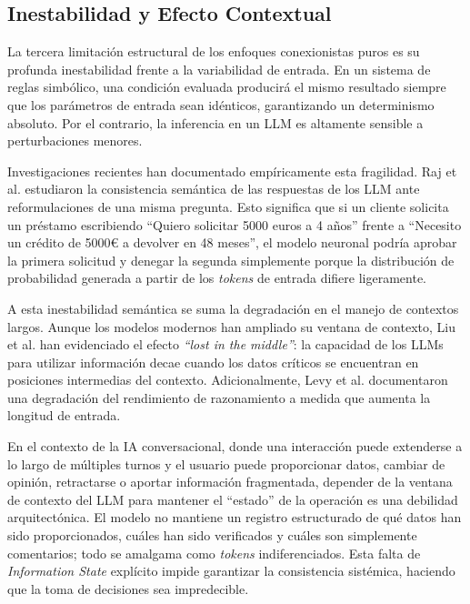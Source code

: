 \documentclass[12pt,a4paper]{report}
\begin{document}
\subsection{Inestabilidad y Efecto Contextual}

La tercera limitación estructural de los enfoques conexionistas puros es su profunda inestabilidad frente a la variabilidad de entrada. En un sistema de reglas simbólico, una condición evaluada producirá el mismo resultado siempre que los parámetros de entrada sean idénticos, garantizando un determinismo absoluto. Por el contrario, la inferencia en un LLM es altamente sensible a perturbaciones menores.

Investigaciones recientes han documentado empíricamente esta fragilidad. Raj et al. \cite{raj2023semantic} estudiaron la consistencia semántica de las respuestas de los LLM ante reformulaciones de una misma pregunta. Esto significa que si un cliente solicita un préstamo escribiendo ``Quiero solicitar 5000 euros a 4 años'' frente a ``Necesito un crédito de 5000€ a devolver en 48 meses'', el modelo neuronal podría aprobar la primera solicitud y denegar la segunda simplemente porque la distribución de probabilidad generada a partir de los \textit{tokens} de entrada difiere ligeramente.

A esta inestabilidad semántica se suma la degradación en el manejo de contextos largos. Aunque los modelos modernos han ampliado su ventana de contexto, Liu et al. \cite{liu2023lostmiddle} han evidenciado el efecto \textit{``lost in the middle''}: la capacidad de los LLMs para utilizar información decae cuando los datos críticos se encuentran en posiciones intermedias del contexto. Adicionalmente, Levy et al. \cite{levy2024inputlength} documentaron una degradación del rendimiento de razonamiento a medida que aumenta la longitud de entrada.

En el contexto de la IA conversacional, donde una interacción puede extenderse a lo largo de múltiples turnos y el usuario puede proporcionar datos, cambiar de opinión, retractarse o aportar información fragmentada, depender de la ventana de contexto del LLM para mantener el ``estado'' de la operación es una debilidad arquitectónica. El modelo no mantiene un registro estructurado de qué datos han sido proporcionados, cuáles han sido verificados y cuáles son simplemente comentarios; todo se amalgama como \textit{tokens} indiferenciados. Esta falta de \textit{Information State} explícito impide garantizar la consistencia sistémica, haciendo que la toma de decisiones sea impredecible.
\end{document}

